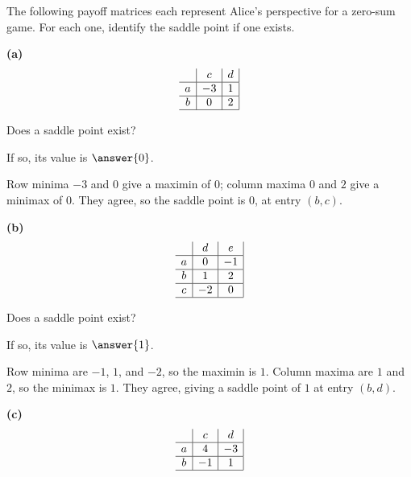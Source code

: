 \documentclass[12pt]{ximera}
\begin{document}
\begin{problem}
The following payoff matrices each represent Alice's perspective for a zero-sum game.
For each one, identify the saddle point if one exists.

\begin{prompt}
\textbf{(a)}
\[
\begin{array}{c|c|c|}
\phantom{|} & c & d \\\hline
a & -3 & 1 \\\hline
b & 0 & 2 \\\hline
\end{array}
\]

Does a saddle point exist?
\begin{multipleChoice}
\end{multipleChoice}

If so, its value is $\answer{0}$.

\begin{feedback}
Row minima $-3$ and $0$ give a maximin of $0$; column maxima $0$ and $2$ give a
minimax of $0$. They agree, so the saddle point is $0$, at entry $(b,c)$.
\end{feedback}
\end{prompt}

\begin{prompt}
\textbf{(b)}
\[
\begin{array}{c|c|c|}
\phantom{|} & d & e \\\hline
a & 0 & -1 \\\hline
b & 1 & 2 \\\hline
c & -2 & 0 \\\hline
\end{array}
\]

Does a saddle point exist?
\begin{multipleChoice}
\end{multipleChoice}

If so, its value is $\answer{1}$.

\begin{feedback}
Row minima are $-1$, $1$, and $-2$, so the maximin is $1$. Column maxima are $1$ and
$2$, so the minimax is $1$. They agree, giving a saddle point of $1$ at entry
$(b,d)$.
\end{feedback}
\end{prompt}

\begin{prompt}
\textbf{(c)}
\[
\begin{array}{c|c|c|}
\phantom{|} & c & d \\\hline
a & 4 & -3 \\\hline
b & -1 & 1 \\\hline
\end{array}
\]


\end{prompt}
\end{problem}
\end{document}

